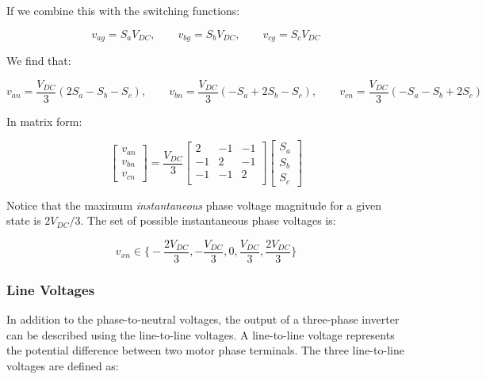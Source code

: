 \documentclass{article}
\begin{document}
If we combine this with the switching functions: 

\begin{equation}
    v_{ag} = S_aV_{DC}, \qquad
    v_{bg} = S_bV_{DC}, \qquad
    v_{cg} = S_cV_{DC}
\end{equation}

We find that:

\begin{equation}
    v_{an} = \frac{V_{DC}}{3}(2S_a - S_b - S_c), \qquad
    v_{bn} = \frac{V_{DC}}{3}(-S_a + 2S_b - S_c), \qquad
    v_{cn} = \frac{V_{DC}}{3}(-S_a - S_b + 2S_c)
\end{equation}

In matrix form:

\begin{equation}
    \begin{bmatrix}
        v_{an} \\
        v_{bn} \\
        v_{cn}
    \end{bmatrix}
    = \frac{V_{DC}}{3}
    \begin{bmatrix}
        2 & -1 & -1 \\
        -1 & 2 & -1 \\
        -1 & -1 & 2 \\
    \end{bmatrix}
    \begin{bmatrix}
        S_a \\
        S_b \\
        S_c
    \end{bmatrix}
\end{equation}

Notice that the maximum \textit{instantaneous} phase voltage magnitude for a given state is $2V_{DC}/3$. The set of possible instantaneous phase voltages is:

\[
    v_{xn} \in \biggl\{ -\frac{2V_{DC}}{3}, -\frac{V_{DC}}{3}, 0, \frac{V_{DC}}{3}, \frac{2V_{DC}}{3} \biggr\}
\]


\subsubsection{Line Voltages}
\label{sec:line-voltages}

In addition to the phase-to-neutral voltages, the output of a three-phase inverter can be described using the line-to-line voltages. A line-to-line voltage represents the potential difference between two motor phase terminals. The three line-to-line voltages are defined as:
\end{document}
